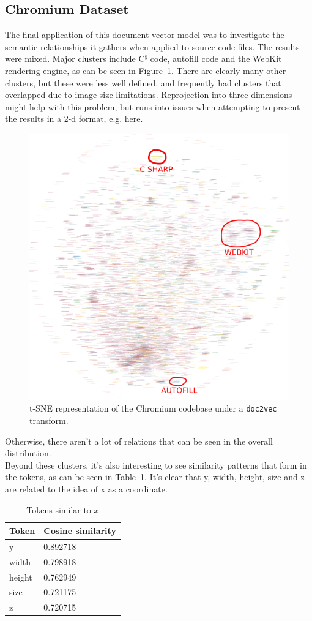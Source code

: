 \documentclass[11pt]{article}
\begin{document}
\subsection*{Chromium Dataset}
The final application of this document vector model was to investigate the
semantic relationships it gathers when applied to source code files. The
results were mixed. Major clusters include C$^\sharp$ code, autofill code and
the WebKit rendering engine, as can be seen in Figure~\ref{fig:tsne}.
There are clearly many other clusters, but these were less well defined, and
frequently had clusters that overlapped due to image size limitations.
Reprojection into three dimensions might help with this problem, but runs into
issues when attempting to present the results in a 2-d format, e.g. here.
\begin{figure}[h]
  \centering
    \includegraphics[width=0.5\linewidth]{chromium-tsne.png}
  \caption{t-SNE representation of the Chromium codebase under a
           \texttt{doc2vec} transform.}
  \label{fig:tsne}
\end{figure}
Otherwise, there aren't a lot of relations that can be seen in the overall
distribution.\\
Beyond these clusters, it's also interesting to see similarity patterns that
form in the tokens, as can be seen in Table~\ref{tab:chromium}. It's clear that
y, width, height, size and z are related to the idea of x as a coordinate.
\begin{table}[h]
  \begin{center}
    \begin{tabular}{l l}
      Token & Cosine similarity\\
      \hline
      y & 0.892718\\
      width & 0.798918\\
      height & 0.762949\\
      size & 0.721175\\
      z & 0.720715\\
    \end{tabular}
  \caption{Tokens similar to $x$}
  \label{tab:chromium}
  \end{center}
\end{table}
\end{document}
